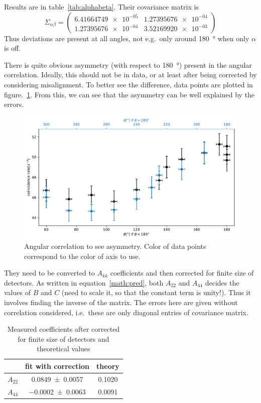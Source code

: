 Results are in table~\ref{tab:alphabeta}. Their covariance matrix is
\begin{equation*}
   \Sigma_{\alpha\beta} = \begin{pmatrix} \num{6.41664749e-05} & \num{1.27395676e-04} \\ \num{1.27395676e-04} & \num{3.52169920e-03} \end{pmatrix}
\end{equation*}
Thus deviations are present at all angles, not e.g.~only around \SI{180}{\degree} when only $\alpha$ is off.

There is quite obvious asymmetry (with respect to \SI{180}{\degree}) present in the angular correlation. Ideally, this should not be in data, or at least after being corrected by considering misalignment. To better see the difference, data points are plotted in figure.~\ref{fig:angAsymm}. From this, we can see that the asymmetry can be well explained by the errors.
\begin{figure}[ht]
   \centering
   \includegraphics[width=0.8\linewidth]{./figs/angAsymm.pdf}
   \caption{Angular correlation to see asymmetry. Color of data points correspond to the color of axis to use.}%
   \label{fig:angAsymm}
\end{figure}

They need to be converted to $A_{kk}$ coefficients and then corrected for finite size of detectors. As written in equation~\eqref{math:pred}, both $A_{22}$ and $A_{44}$ decides the values of $B$ and $C$ (need to scale it, so that the constant term is unity!). Thus it involves finding the inverse of the matrix. The errors here are given without correlation considered, i.e.~these are only diagonal entries of covariance matrix.
\begin{table}[htpb]
   \centering
   \label{tab:Akk}
 \begin{tabular}{ccc}
   \toprule
   &  fit with correction &  theory \\
   \midrule
   $A_{22}$ & \num{0.0849 +- 0.0057} & 0.1020 \\
   $A_{44}$  & \num{-0.0002 +- 0.0063}& 0.0091 \\
   \bottomrule
\end{tabular}
\caption{Measured coefficients after corrected for finite size of detectors and theoretical values}
\end{table}

